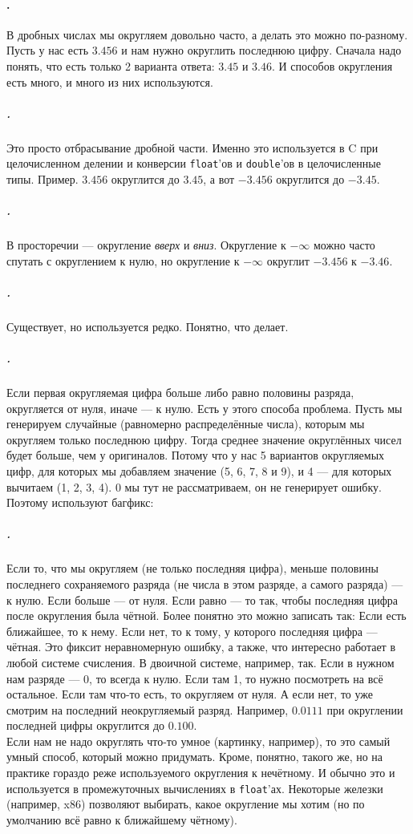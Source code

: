 \documentclass{article}
\begin{document}
    \paragraph{.}
    В дробных числах мы округляем довольно часто, а делать это можно по-разному. Пусть у нас есть $3.456$ и нам нужно округлить последнюю цифру. Сначала надо понять, что есть только 2 варианта ответа: $3.45$ и $3.46$. И способов округления есть много, и много из них используются.
    \subparagraph{.} Это просто отбрасывание дробной части. Именно это используется в C при целочисленном делении и конверсии \texttt{float}'ов и \texttt{double}'ов в целочисленные типы. Пример. $3.456$ округлится до $3.45$, а вот $-3.456$ округлится до $-3.45$.
    \subparagraph{.} В просторечии --- округление \textit{вверх} и \textit{вниз}. Округление к $-\infty$ можно часто спутать с округлением к нулю, но округление к $-\infty$ округлит $-3.456$ к $-3.46$.
    \subparagraph{.} Существует, но используется редко. Понятно, что делает.
    \subparagraph{.} Если первая округляемая цифра больше либо равно половины разряда, округляется от нуля, иначе --- к нулю. Есть у этого способа проблема. Пусть мы генерируем случайные (равномерно распределённые числа), которым мы округляем только последнюю цифру. Тогда среднее значение округлённых чисел будет больше, чем у оригиналов. Потому что у нас 5 вариантов округляемых цифр, для которых мы добавляем значение (5, 6, 7, 8 и 9), и 4 --- для которых вычитаем (1, 2, 3, 4). 0 мы тут не рассматриваем, он не генерирует ошибку. Поэтому используют багфикс:
    \subparagraph{.} Если то, что мы округляем (не только последняя цифра), меньше половины последнего сохраняемого разряда (не числа в этом разряде, а самого разряда) --- к нулю. Если больше --- от нуля. Если равно --- то так, чтобы последняя цифра после округления была чётной. Более понятно это можно записать так: Если есть ближайшее, то к нему. Если нет, то к тому, у которого последняя цифра --- чётная. Это фиксит неравномерную ошибку, а также, что интересно работает в любой системе счисления. В двоичной системе, например, так. Если в нужном нам разряде --- 0, то всегда к нулю. Если там 1, то нужно посмотреть на всё остальное. Если там что-то есть, то округляем от нуля. А если нет, то уже смотрим на последний неокругляемый разряд. Например, $0.0111$ при округлении последней цифры округлится до $0.100$.\\
    Если нам не надо округлять что-то умное (картинку, например), то это самый умный способ, который можно придумать. Кроме, понятно, такого же, но на практике гораздо реже используемого округления к нечётному. И обычно это и используется в промежуточных вычислениях в \texttt{float}'ах. Некоторые железки (например, x86) позволяют выбирать, какое округление мы хотим (но по умолчанию всё равно к ближайшему чётному).
    
\end{document}
